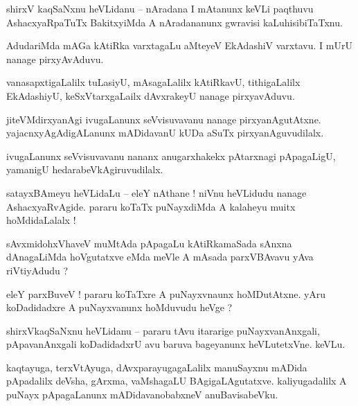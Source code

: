 \documentclass{article}
\begin{document}
\begin{mn}%
shirxV kaqSaNxnu heVLidanu -- nAradana I mAtanunx keVLi paqthuvu AshacxyaRpaTuTx BakitxyiMda A 
nAradananunx gwravisi kaLuhisibiTaTxnu.
\end{mn}

\begin{mn}%
AdudariMda mAGa kAtiRka varxtagaLu aMteyeV EkAdashiV varxtavu. I mUrU nanage pirxyAvAduvu.
\end{mn}

\begin{mn}%
vanasapxtigaLalilx tuLasiyU, mAsagaLalilx kAtiRkavU, tithigaLalilx EkAdashiyU, keSxVtarxgaLailx 
dAvxrakeyU nanage pirxyavAduvu.
\end{mn}

\begin{mn}%
jiteVMdirxyanAgi ivugaLanunx seVvisuvavanu nanage pirxyanAgutAtxne. yajacnxyAgAdigALanunx 
mADidavanU kUDa aSuTx pirxyanAguvudilalx.
\end{mn}

\begin{mn}%
ivugaLanunx seVvisuvavanu nananx anugarxhakekx pAtarxnagi pApagaLigU, yamanigU 
hedarabeVkAgiruvudilalx.
\end{mn}

\begin{mn}%
satayxBAmeyu heVLidaLu -- eleY nAthane ! niVnu heVLidudu nanage AshacxyaRvAgide. pararu koTaTx 
puNayxdiMda A kalaheyu muitx hoMdidaLalalx !
\end{mn}

\begin{mn}%
sAvxmidohxVhaveV muMtAda pApagaLu kAtiRkamaSada sAnxna dAnagaLiMda hoVgutatxve eMda meVle A mAsada 
parxVBAvavu yAva riVtiyAdudu ?
\end{mn}

\begin{mn}%
eleY parxBuveV ! pararu koTaTxre A puNayxvnaunx hoMDutAtxne. yAru koDadidadxre A puNayxvanunx 
hoMduvudu heVge ?
\end{mn}

\begin{mn}%
shirxVkaqSaNxnu heVLidanu -- pararu tAvu itararige puNayxvanAnxgali, pApavanAnxgali koDadidadxrU 
avu baruva bageyanunx heVLutetxVne. keVLu.
\end{mn}

\begin{mn}%
kaqtayuga, terxVtAyuga, dAvxparayugagaLalilx manuSayxnu mADida pApadalilx deVsha, gArxma, 
vaMshagaLU BAgigaLAgutatxve. kaliyugadalilx A puNayx pApagaLanunx mADidavanobabxneV anuBavisabeVku.
\end{mn}
\end{document}

